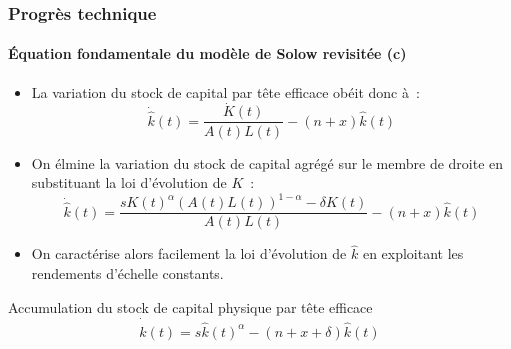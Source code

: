 \documentclass[10pt,notheorems]{beamer}
\theoremstyle{plain}
\theoremstyle{definition} %
\begin{document}
\begin{frame}
  \frametitle{Progrès technique}
  \framesubtitle{Équation fondamentale du modèle de Solow revisitée (c)}

  \bigskip

  \begin{itemize}

  \item La variation du stock de capital par tête efficace obéit donc à~:
    \[
      \dot{\hat k}(t) = \frac{\dot K(t)}{A(t)L(t)} -(n+x)\hat k(t)
    \]

    \bigskip

  \item On élmine la variation du stock de capital agrégé sur le membre de droite en substituant la loi d'évolution de $K$~:
    \[
      \dot{\hat k}(t) = \frac{sK(t)^{\alpha}\left(A(t)L(t)\right)^{1-\alpha}-\delta K(t)}{A(t)L(t)} -(n+x)\hat k(t)
    \]

  \item On caractérise alors facilement la loi d'évolution de $\hat k$ en exploitant les rendements d'échelle constants.\newline
  \end{itemize}

  \begin{block}{Accumulation du stock de capital physique par tête efficace}
    \[
      \dot{\hat{k}}(t) =  s \hat k(t)^{\alpha} -  (n+x+\delta) \hat k(t)
    \]
  \end{block}

\end{frame}
\end{document}
